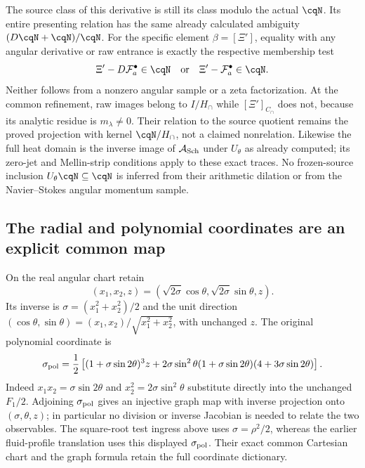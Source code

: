 The source class of this derivative is still its class modulo
the actual $\cqN$. Its entire presenting relation has the same
already calculated ambiguity $(D\cqN+\cqN)/\cqN$.
For the specific element $\beta=[\Xi']$, equality with any
angular derivative or raw entrance is exactly the respective
membership test
\[
 \Xi'-D\mathcal F_a^\bullet\in\cqN
 \quad\text{or}\quad
 \Xi'-\mathcal F_a^\bullet\in\cqN.
\]
Neither follows from a nonzero angular sample or a zeta
factorization. At the common refinement, raw images belong to
$I/H_\cap$ while $[\Xi']_{C_\cap}$ does not, because its
analytic residue is $m_\lambda\ne0$. Their relation to the
source quotient remains the proved projection with kernel
$\cqN/H_\cap$, not a claimed nonrelation.
Likewise the full heat domain is the inverse image of
$\mathcal A_{\rm Sch}$ under $U_\theta$ as already computed;
its zero-jet and Mellin-strip conditions apply to these exact
traces. No frozen-source inclusion $U_\theta\cqN\subseteq\cqN$
is inferred from their arithmetic dilation or from the
Navier--Stokes angular momentum sample.

\subsection{The radial and polynomial coordinates are an explicit common map}

On the real angular chart retain
\[
 (x_1,x_2,z)
   =(\sqrt{2\sigma}\cos\theta,\sqrt{2\sigma}\sin\theta,z).
\]
Its inverse is $\sigma=(x_1^2+x_2^2)/2$ and the unit direction
$(\cos\theta,\sin\theta)=(x_1,x_2)/\sqrt{x_1^2+x_2^2}$,
with unchanged $z$. The original polynomial coordinate is
\[
 \sigma_{\rm pol}=\frac12\left[
 (1+\sigma\sin2\theta)^3z+
 2\sigma\sin^2\theta(1+\sigma\sin2\theta)
                        (4+3\sigma\sin2\theta)\right].
\]
Indeed $x_1x_2=\sigma\sin2\theta$ and
$x_2^2=2\sigma\sin^2\theta$ substitute directly into the
unchanged $F_1/2$. Adjoining $\sigma_{\rm pol}$ gives an
injective graph map with inverse projection onto
$(\sigma,\theta,z)$; in particular no division or inverse
Jacobian is needed to relate the two observables. The
square-root test ingress above uses $\sigma=\rho^2/2$, whereas
the earlier fluid-profile translation uses this displayed
$\sigma_{\rm pol}$. Their exact common Cartesian chart and
the graph formula retain the full coordinate dictionary.
